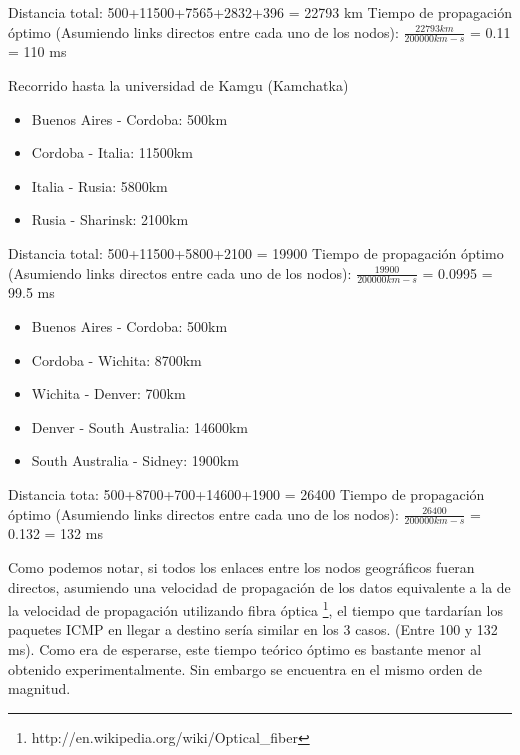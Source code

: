 Distancia total: 500+11500+7565+2832+396 = 22793 km
Tiempo de propagación óptimo (Asumiendo links directos entre cada uno de los nodos):
$\frac{22793km}{200000km-s}$ = 0.11 = 110 ms


Recorrido hasta la universidad de Kamgu (Kamchatka)

\begin{itemize}
	\item Buenos Aires - Cordoba: 500km
	\item Cordoba - Italia: 11500km
	\item Italia - Rusia: 5800km
	\item Rusia - Sharinsk:  2100km
\end{itemize}

Distancia total: 500+11500+5800+2100 = 19900
Tiempo de propagación óptimo (Asumiendo links directos entre cada uno de los nodos):
$\frac{19900}{200000km-s}$ = 0.0995 = 99.5 ms


\begin{itemize}
	\item Buenos Aires - Cordoba: 500km
	\item Cordoba - Wichita: 8700km
	\item Wichita - Denver: 700km
	\item Denver - South Australia: 14600km
	\item South Australia - Sidney:  1900km
\end{itemize}

Distancia tota: 500+8700+700+14600+1900 = 26400
Tiempo de propagación óptimo (Asumiendo links directos entre cada uno de los nodos):
$\frac{26400}{200000km-s}$ = 0.132 = 132 ms

Como podemos notar, si todos los enlaces entre los nodos geográficos fueran directos,
asumiendo una velocidad de propagación de los datos equivalente a la de la velocidad
de propagación utilizando fibra óptica \footnote{http://en.wikipedia.org/wiki/Optical\_fiber}, el tiempo que tardarían los paquetes ICMP en llegar a destino sería similar en los 3 casos. (Entre 100 y 132 ms). Como era de esperarse, este tiempo teórico óptimo es bastante menor al obtenido experimentalmente. Sin embargo se encuentra en el mismo orden de magnitud.


















